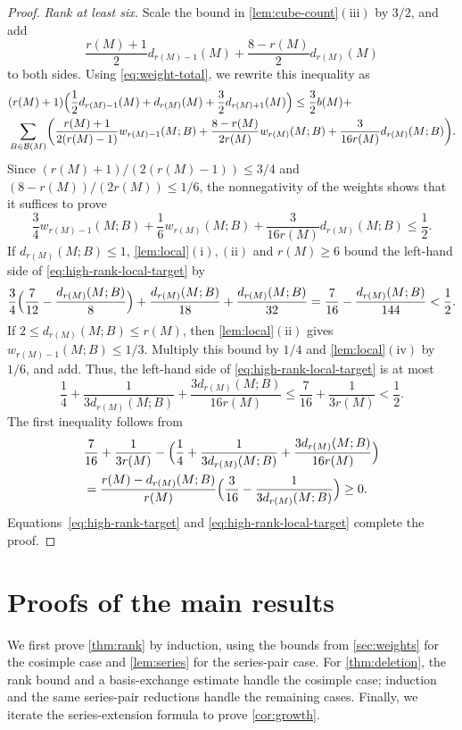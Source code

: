 \documentclass[10pt,a4paper]{article}
\numberwithin{equation}{section}
\newcommand{\BB}{\mathcal B}
\newcommand{\wloc}[1]{w_{#1}(M;B)}
\newcommand{\dloc}[1]{d_{#1}(M;B)}
\begin{document}
\begin{proof}
\emph{Rank at least six.}
Scale the bound in \autoref{lem:cube-count}\(\mathrm{(iii)}\)
by \(3/2\), and add
\[
 \frac{r(M)+1}2d_{r(M)-1}(M)+\frac{8-r(M)}2d_{r(M)}(M)
\]
to both sides.
Using \eqref{eq:weight-total}, we rewrite this inequality as
\begin{align}
 &(r(M)+1)\Bigl(\frac12d_{r(M)-1}(M)+d_{r(M)}(M)+\frac32d_{r(M)+1}(M)\Bigr)\le\frac32b(M)+\notag\\
 &\sum_{B\in\BB(M)}\biggl(\frac{r(M)+1}{2(r(M)-1)}\wloc{r(M)-1}+\frac{8-r(M)}{2r(M)}\wloc{r(M)}+\frac3{16r(M)}\dloc{r(M)}\biggr).
 \label{eq:high-rank-target}
\end{align}
Since \((r(M)+1)/(2(r(M)-1))\le3/4\) and
\((8-r(M))/(2r(M))\le1/6\), the nonnegativity of the weights
shows that it suffices to prove
\begin{equation}\label{eq:high-rank-local-target}
 \frac34\wloc{r(M)-1}+\frac16\wloc{r(M)}
 +\frac3{16r(M)}\dloc{r(M)}\le\frac12.
\end{equation}
If \(\dloc{r(M)}\le1\), \autoref{lem:local}\(\mathrm{(i),(ii)}\)
and \(r(M)\ge6\)
bound the left-hand side of
\eqref{eq:high-rank-local-target} by
\[
 \frac34\Bigl(\frac7{12}-\frac{\dloc{r(M)}}8\Bigr)
 +\frac{\dloc{r(M)}}{18}+\frac{\dloc{r(M)}}{32}
 =\frac7{16}-\frac{\dloc{r(M)}}{144}<\frac12.
\]
If \(2\le\dloc{r(M)}\le r(M)\), then
\autoref{lem:local}\(\mathrm{(ii)}\) gives
\(\wloc{r(M)-1}\le1/3\).
Multiply this bound by \(1/4\) and
\autoref{lem:local}\(\mathrm{(iv)}\) by \(1/6\), and add.
Thus, the left-hand side of \eqref{eq:high-rank-local-target} is at most
\[
 \frac14+\frac1{3\dloc{r(M)}}+\frac{3\dloc{r(M)}}{16r(M)}
 \le\frac7{16}+\frac1{3r(M)}<\frac12.
\]
The first inequality follows from
\begin{align*}
 &\frac7{16}+\frac1{3r(M)}-\Bigl(\frac14+\frac1{3\dloc{r(M)}}+\frac{3\dloc{r(M)}}{16r(M)}\Bigr)\\
 &=\frac{r(M)-\dloc{r(M)}}{r(M)}\Bigl(\frac3{16}-\frac1{3\dloc{r(M)}}\Bigr)\ge0.
\end{align*}
Equations~\eqref{eq:high-rank-target} and
\eqref{eq:high-rank-local-target} complete the proof.
\end{proof}

\section{Proofs of the main results}\label{sec:proofs}

We first prove \autoref{thm:rank} by induction, using the bounds from
\autoref{sec:weights} for the cosimple case and \autoref{lem:series} for
the series-pair case. For \autoref{thm:deletion}, the rank bound and a
basis-exchange estimate handle the cosimple case; induction and the same
series-pair reductions handle the remaining cases. Finally, we iterate
the series-extension formula to prove \autoref{cor:growth}.
\end{document}
